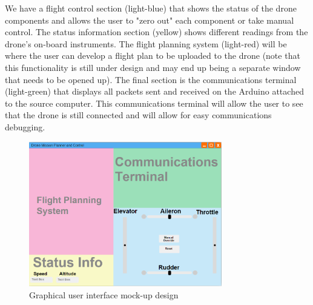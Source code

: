 \documentclass[12pt,a4paper]{article}
\begin{document}
We have a flight control section (light-blue) that shows the status of the drone components and allows the user to "zero out" each component or take manual control. The status information section (yellow) shows different readings from the drone's on-board instruments. The flight planning system (light-red) will be where the user can develop a flight plan to be uploaded to the drone (note that this functionality is still under design and may end up being a separate window that needs to be opened up). The final section is the communications terminal (light-green) that displays all packets sent and received on the Arduino attached to the source computer. This communications terminal will allow the user to see that the drone is still connected and will allow for easy communications debugging.

	\begin{figure}[h!]

  		\centering
    	\includegraphics[width=0.75\textwidth]{guiMockup.png}
   		\caption{Graphical user interface mock-up design}
	\end{figure}
\end{document}
